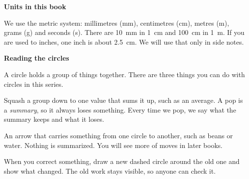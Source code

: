 {\sans\bfseries\large\color{sky!70!black} Units in this book}\par
We use the metric system: millimetres (mm), centimetres (cm), metres (m), grams (g) and seconds (s).
There are 10~mm in 1~cm and 100~cm in 1~m. If you are used to inches, one inch is about 2.5~cm. We will use that only in side notes.
\clearpage

\thispagestyle{plain}\label{circlecard}
{\sans\bfseries\LARGE\color{ink} Reading the circles}\par\vspace{0.1cm}
A circle holds a group of things together. There are three things you can do with circles in this series.

\begin{center}
\end{center}

\begin{description}[leftmargin=0pt,itemsep=0.4em,style=unboxed]
\item[\textcolor{tomato}{\sans\bfseries Pop}] Squash a group down to one value that sums it up, such as an average. A pop is a \emph{summary}, so it always loses something. Every time we pop, we say what the summary keeps and what it loses.
\item[\textcolor{sky!70!black}{\sans\bfseries Move}] An arrow that carries something from one circle to another, such as beans or water. Nothing is summarized. You will see more of moves in later books.
\item[\textcolor{tangerine!80!black}{\sans\bfseries Wrap}] When you correct something, draw a new dashed circle around the old one and show what changed. The old work stays visible, so anyone can check it.
\end{description}


